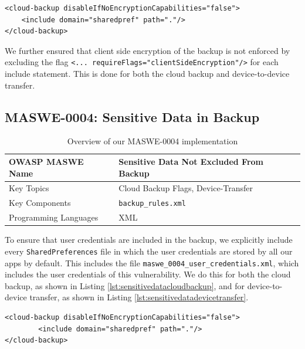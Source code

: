 \begin{lstlisting}[float=tbh, style=XMLStyle, mathescape=true, captionpos=b, caption={Backup rules for \texttt{maswe\_0003}}, label=lst:xmlbackup]
<cloud-backup disableIfNoEncryptionCapabilities="false">
    <include domain="sharedpref" path="."/>
</cloud-backup>
\end{lstlisting}

We further ensured that client side encryption of the backup is not enforced by excluding the flag \lstinline|<... requireFlags="clientSideEncryption"/>| for each include statement. This is done for both the cloud backup and device-to-device transfer.

\subsection{MASWE-0004: Sensitive Data in Backup}

\begin{table}[H]
\centering
\renewcommand{\arraystretch}{1.3}
\begin{tabular}{p{5cm} p{8cm} } 
\toprule  
OWASP MASWE Name & Sensitive Data Not Excluded From Backup \\ 
\midrule  
Key Topics & Cloud Backup Flags, Device-Transfer \\ 
Key Components & \texttt{backup\_rules.xml} \\ 
Programming Languages & XML \\ 
\bottomrule
\end{tabular}
\caption{Overview of our MASWE-0004 implementation}
\label{tab:maswe-0004}
\end{table}

To ensure that user credentials are included in the backup, we explicitly include every \texttt{SharedPreferences} file in which the user credentials are stored by all our apps by default. This includes the file \texttt{maswe\_0004\_user\_credentials.xml}, which includes the user credentials of this vulnerability. We do this for both the cloud backup, as shown in Listing \ref{lst:sensitivedatacloudbackup}, and for device-to-device transfer, as shown in Listing \ref{lst:sensitivedatadevicetransfer}.

\begin{lstlisting}[float=tbh, style=XMLStyle, mathescape=true, captionpos=b, caption={Cloud backup rules for \texttt{maswe\_0004}}, label=lst:sensitivedatacloudbackup]
<cloud-backup disableIfNoEncryptionCapabilities="false">
        <include domain="sharedpref" path="."/>
</cloud-backup>
\end{lstlisting}

